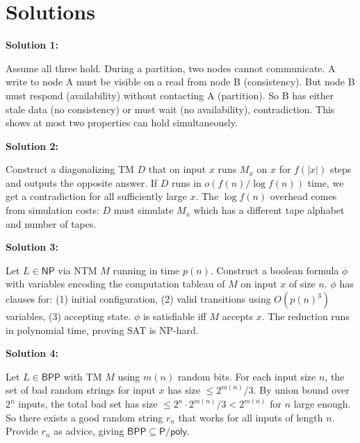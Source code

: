 \documentclass[12pt,a4paper]{exam}
\begin{document}
\newpage
\section*{Solutions}

\textbf{Solution 1:}

Assume all three hold. During a partition, two nodes cannot communicate. A write to node A must be visible on a read from node B (consistency). But node B must respond (availability) without contacting A (partition). So B has either stale data (no consistency) or must wait (no availability), contradiction. This shows at most two properties can hold simultaneously.

\vspace{0.5cm}

\textbf{Solution 2:}

Construct a diagonalizing TM $D$ that on input $x$ runs $M_x$ on $x$ for $f(|x|)$ steps and outputs the opposite answer. If $D$ runs in $o(f(n)/\log f(n))$ time, we get a contradiction for all sufficiently large $x$. The $\log f(n)$ overhead comes from simulation costs: $D$ must simulate $M_x$ which has a different tape alphabet and number of tapes.

\vspace{0.5cm}

\textbf{Solution 3:}

Let $L \in \mathsf{NP}$ via NTM $M$ running in time $p(n)$. Construct a boolean formula $\phi$ with variables encoding the computation tableau of $M$ on input $x$ of size $n$. $\phi$ has clauses for: (1) initial configuration, (2) valid transitions using $O(p(n)^3)$ variables, (3) accepting state. $\phi$ is satisfiable iff $M$ accepts $x$. The reduction runs in polynomial time, proving SAT is NP-hard.

\vspace{0.5cm}

\textbf{Solution 4:}

Let $L \in \mathsf{BPP}$ with TM $M$ using $m(n)$ random bits. For each input size $n$, the set of bad random strings for input $x$ has size $\leq 2^{m(n)}/3$. By union bound over $2^n$ inputs, the total bad set has size $\leq 2^n \cdot 2^{m(n)}/3 < 2^{m(n)}$ for $n$ large enough. So there exists a good random string $r_n$ that works for all inputs of length $n$. Provide $r_n$ as advice, giving $\mathsf{BPP} \subseteq \mathsf{P}/\mathsf{poly}$.

\vspace{0.5cm}
\end{document}
